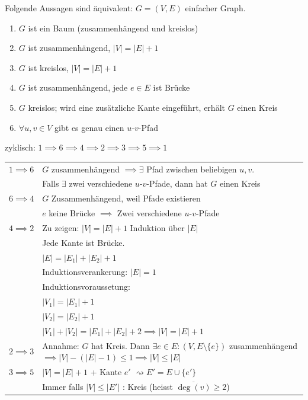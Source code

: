 \begin{satz*}
	Folgende Aussagen sind äquivalent: $G=(V,E)$ einfacher Graph.
	\begin{enumerate}
		\item $G$ ist ein Baum (zusammenhängend und kreislos)
		\item $G$ ist zusammenhängend, $|V| = |E| + 1$
		\item $G$ ist kreislos, $|V| = |E| + 1$
		\item $G$ ist zusammenhängend, jede $e \in E$ ist Brücke
		\item $G$ kreislos; wird eine zusätzliche Kante eingeführt, erhält $G$ einen Kreis
		\item $\forall u , v \in V$ gibt es genau einen $u$-$v$-Pfad
	\end{enumerate}
	\begin{bew}
		zyklisch: $1 \implies 6 \implies 4 \implies 2 \implies 3 \implies 5 \implies 1$\\
		\begin{tabular}{l p{9cm} }
			$1 \implies 6$	&$G$ zusammenhängend $\implies \exists$ Pfad zwischen beliebigen $u,v$.\\
						&Falls $\exists$ zwei verschiedene $u$-$v$-Pfade, dann hat $G$ einen Kreis \lightning \\
			$6 \implies 4$	&$G$ Zusammenhängend, weil Pfade existieren\\
						&$e$ keine Brücke $\implies$ Zwei verschiedene $u$-$v$-Pfade \lightning \\
			$4 \implies 2$	&Zu zeigen: $|V| = |E| + 1$ Induktion über $|E|$ \\
						&Jede Kante ist Brücke. \\
						&$|E| = |E_1| + |E_2| + 1$ \\
						&Induktionsverankerung: $|E| = 1$ \\
						&Induktionsvoraussetung:\\
						&$|V_1| = |E_1| + 1$ \\
						&$|V_2| = |E_2| + 1$ \\
						&$|V_1| + |V_2| = |E_1| + |E_2| + 2 \implies |V| = |E| + 1$ \\
			$2 \implies 3$	&Annahme: $G$ hat Kreis. Dann $\exists e \in E : (V,E \setminus \{e\})$ zusammenhängend $\implies |V| - (|E| - 1 ) \leq 1 \implies |V| \leq |E|$ \lightning \\
			$3 \implies 5$	&$|V| = |E| + 1$ + Kante $e'$ $\rightsquigarrow E' = E \cup \{e'\}$ \\
						&Immer falls  $|V| \leq |E'|$ : Kreis (heisst $\overline{\deg(v)} \geq 2$) \\

\end{tabular}
\end{bew}
\end{satz*}
